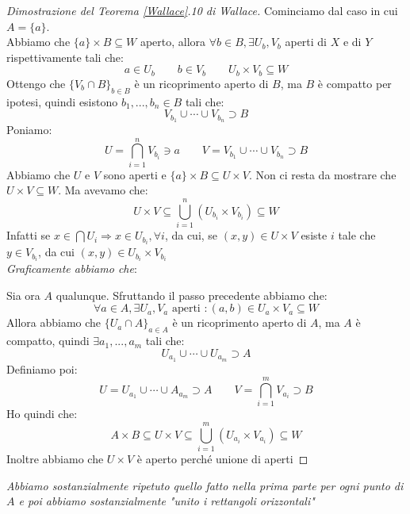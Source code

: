 \documentclass[11pt,a4paper,twoside]{article}
\theoremstyle{definition}
\begin{document}
\begin{proof}[Dimostrazione del Teorema \ref{Wallace}.10 di Wallace]
	Cominciamo dal caso in cui $A = \{a\}$.\\
	Abbiamo che $\{a\} \times B \subseteq W$ aperto, allora $\forall b \in B, \exists U_b, V_b$ aperti di $X$ e di $Y$ rispettivamente tali che:
	\[ a \in U_b \qquad b \in V_b\qquad U_b \times V_b \subseteq W \]
	Ottengo che $\{V_b \cap B\}_{b \in B}$ è un ricoprimento aperto di $B$, ma $B$ è compatto per ipotesi, quindi esistono $b_1,...,b_n \in B$ tali che:
	\[ V_{b_1}\cup\cdots \cup V_{b_n} \supset B \]
	Poniamo:
	\[ U = \bigcap_{i = 1}^n V_{b_i} \ni a\qquad V = V_{b_1}\cup \cdots \cup V_{b_n} \supset B \]
	Abbiamo che $U$ e $V$ sono aperti e $\{a\}\times B\subseteq U \times V$. Non ci resta da mostrare che $U \times V \subseteq W$. Ma avevamo che:
	\[ U \times V \subseteq \bigcup_{i = 1}^n (U_{b_i}\times V_{b_i}) \subseteq W \]
	Infatti se $x \in \bigcap U_i \Rightarrow x\in U_{b_i}, \forall i$, da cui, se $(x,y) \in U\times V$ esiste $i$ tale che $y \in V_{b_i}$, da cui $(x,y) \in U_{b_i} \times V_{b_i}$\\
	\textit{Graficamente abbiamo che}:
	\begin{center}
	\end{center}

	Sia ora $A$ qualunque. Sfruttando il passo precedente abbiamo che:
	\[ \forall a \in A, \exists U_a, V_a \text{ aperti }: (a,b) \in U_a \times V_a \subseteq W\]
	Allora abbiamo che $\{ U_a \cap A \}_{a \in A}$ è un ricoprimento aperto di $A$, ma $A$ è compatto, quindi $\exists a_1,...,a_m$ tali che:
	\[ U_{a_1} \cup \cdots \cup  U_{a_m} \supset A\]
	Definiamo poi:
	\[ U = U_{a_1} \cup \cdots \cup A_{a_m} \supset A \qquad V = \bigcap_{i = 1}^m V_{a_i} \supset B \]
	Ho quindi che:
	\[ A \times B \subseteq U \times V \subseteq \bigcup_{i = 1}^m (U_{a_i}\times V_{a_i})\subseteq W\]
	Inoltre abbiamo che $U \times V$ è aperto perché unione di aperti
\end{proof}
\textit{Abbiamo sostanzialmente ripetuto quello fatto nella prima parte per ogni punto di $A$ e poi abbiamo sostanzialmente "unito i rettangoli orizzontali"}
\end{document}
